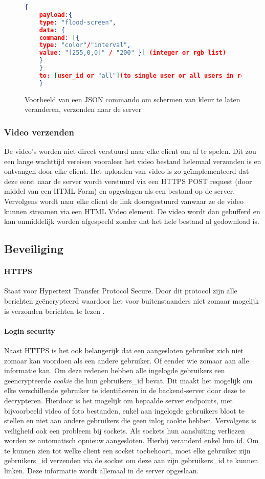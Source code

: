 \begin{figure} [h]
    \begin{lstlisting}[language=json,firstnumber=1]
    {
    payload:{
    type: "flood-screen",
    data: {
    command: [{
    type: "color"/"interval",
    value: "[255,0,0]" / "200" }] (integer or rgb list)
    }
    }
    to: [user_id or "all"](to single user or all users in room)
    }

    \end{lstlisting}
    \caption{Voorbeeld van een JSON commando om schermen van kleur te laten veranderen, verzonden naar de server} \label{jsonScreenCommand}
\end{figure}

\subsubsection{Video verzenden}
De video's worden niet direct verstuurd naar elke client om af te spelen. Dit zou een lange wachttijd vereisen vooraleer het video bestand helemaal verzonden is en ontvangen door elke client.
Het uploaden van video is zo geïmplementeerd dat deze eerst naar de server wordt verstuurd via een HTTPS POST request (door middel van een HTML Form) en opgeslagen als een bestand op de server. Vervolgens wordt naar elke client de link doorsgestuurd vanwaar ze de video kunnen streamen via een HTML Video element. De video wordt dan gebufferd en kan onmiddelijk worden afgespeeld zonder dat het hele bestand al gedownload is.

\subsection{Beveiliging}
\paragraph{HTTPS} Staat voor Hypertext Transfer Protocol Secure. Door dit protocol zijn alle berichten geëncrypteerd waardoor het voor buitenstaanders niet zomaar mogelijk is verzonden berichten te lezen .
\paragraph{Login security} Naast HTTPS is het ook belangerijk dat een aangesloten gebruiker zich niet zomaar kan voordoen als een andere gebruiker. Of eender wie zomaar aan alle informatie kan. Om deze redenen hebben alle ingelogde gebruikers een geëncrypteerde \textit{cookie} die hun gebruikers\_id bevat. Dit maakt het mogelijk om elke verschillende gebruiker te identificeren in de backend-server door deze te decrypteren. Hierdoor is het mogelijk om bepaalde server endpoints, met bijvoorbeeld video of foto bestanden, enkel aan ingelogde gebruikers bloot te stellen en niet aan andere gebruikers die geen inlog cookie hebben.
Vervolgens is veiligheid ook een probleem bij sockets. Als sockets hun aansluiting verliezen worden ze automatisch opnieuw aangesloten. Hierbij veranderd enkel hun id. Om te kunnen zien tot welke client een socket toebehoort, moet elke gebruiker zijn gebruikers\_id verzenden via de socket om deze aan zijn gebruikers\_id te kunnen linken. Deze informatie wordt allemaal in de server opgeslaan.

